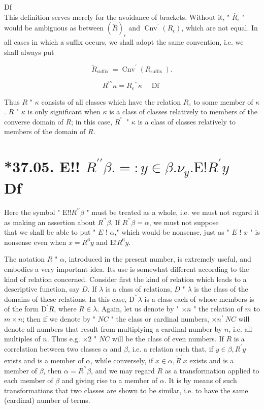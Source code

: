 \documentclass[10pt]{article}
\begin{document}
Df\\
This definition serves merely for the avoidance of brackets. Without it, " $\breve{R_{\epsilon}}$ " would be ambiguous as between $(\breve{R})_{\epsilon}$ and $\operatorname{Cnv}^{\prime}\left(R_{\epsilon}\right)$, which are not equal. In all cases in which a suffix occurs, we shall adopt the same convention, i.e. we shall always put

$$
\breve{R}_{\text {suffix }}=\operatorname{Cnv}^{\prime}\left(R_{\text {suffix }}\right) .
$$


\begin{equation*}
R^{\prime \prime \prime} \kappa=R_{e}{ }^{\prime \prime} \kappa \quad \text { Df } \tag{$* 37.04$.}
\end{equation*}


Thus $R$ " $\kappa$ consists of all classes which have the relation $R_{e}$ to some member of $\kappa$. $R$ " $\kappa$ is only significant when $\kappa$ is a class of classes relatively to members of the converse domain of $R$; in this case, $R^{\text {" }}$ " $\kappa$ is a class of classes relatively to members of the domain of $R$.

\section*{*37.05. E!! $R^{\prime \prime} \beta .=: y \in \beta . \nu_{y} . \mathrm{E}!R^{\prime} y \quad$ Df}
Here the symbol " $\mathrm{E}!!R^{\prime \prime} \beta$ " must be treated as a whole, i.e. we must not regard it as making an assertion about $R^{\prime \prime} \beta$. If $R^{\prime \prime} \beta=\alpha$, we must not suppose\\
that we shall be able to put " $E$ ! $\alpha$," which would be nonsense, just as " $E$ ! $x$ " is nonsense even when $x=R^{6} y$ and $\mathrm{E}!R^{6} y$.

The notation $R$ " $\alpha$, introduced in the present number, is extremely useful, and embodies a very important idea. Its use is somewhat different according to the kind of relation concerned. Consider first the kind of relation which leads to a descriptive function, say $D$. If $\lambda$ is a class of relations, $D$ " $\lambda$ is the class of the domains of these relations. In this case, $\mathrm{D}^{\prime \prime} \lambda$ is a class each of whose members is of the form $\mathrm{D}^{\prime} R$, where $R \in \lambda$. Again, let us denote by " $\times n$ " the relation of $m$ to $m \times n$; then if we denote by " $N C$ " the class or cardinal numbers, $\times n^{\text {" }} N C$ will denote all numbers that result from multiplying a cardinal number by $n$, i.e. all multiples of $n$. Thus e.g. $\times 2$ " $N C$ will be the class of even numbers. If $R$ is a correlation between two classes $\alpha$ and $\beta$, i.e. a relation such that, if $y \in \beta, R^{\prime} y$ exists and is a member of $\alpha$, while conversely, if $x \in \alpha, \breve{R}^{\prime} x$ exists and is a member of $\beta$, then $\alpha=R^{\prime \prime} \beta$, and we may regard $R$ as a transformation applied to each member of $\beta$ and giving rise to a member of $\alpha$. It is by means of such transformations that two classes are shown to be similar, i.e. to have the same (cardinal) number of terms.
\end{document}
